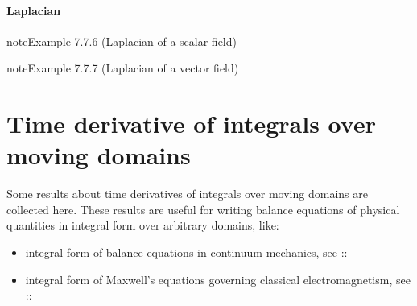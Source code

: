 \documentclass[letterpaper,10pt,english]{jupyterBook}
\begin{document}
\subsubsection{Laplacian}
\label{\detokenize{ch/tensor-algebra-calculus/calculus-euclidean-spherical:laplacian}}\label{\detokenize{ch/tensor-algebra-calculus/calculus-euclidean-spherical:tensor-calculus-spherical-differential-operators-laplacian}}\label{ch/tensor-algebra-calculus/calculus-euclidean-spherical:example-5}
\begin{sphinxadmonition}{note}{Example 7.7.6 (Laplacian of a scalar field)}


\end{sphinxadmonition}
\label{ch/tensor-algebra-calculus/calculus-euclidean-spherical:example-6}
\begin{sphinxadmonition}{note}{Example 7.7.7 (Laplacian of a vector field)}


\end{sphinxadmonition}

\sphinxstepscope


\chapter{Time derivative of integrals over moving domains}
\label{\detokenize{ch/tensor-algebra-calculus/time-derivative-of-integrals:time-derivative-of-integrals-over-moving-domains}}\label{\detokenize{ch/tensor-algebra-calculus/time-derivative-of-integrals:tensor-calculus-time-derivative-of-integrals}}\label{\detokenize{ch/tensor-algebra-calculus/time-derivative-of-integrals::doc}}
\sphinxAtStartPar
Some results about time derivatives of integrals over moving domains are collected here. These results are useful for writing balance equations of physical quantities in integral form over arbitrary domains, like:
\begin{itemize}
\item {} 
\sphinxAtStartPar
integral form of balance equations in continuum mechanics, see ::

\item {} 
\sphinxAtStartPar
integral form of Maxwell’s equations governing classical electromagnetism, see ::

\end{itemize}
\end{document}
